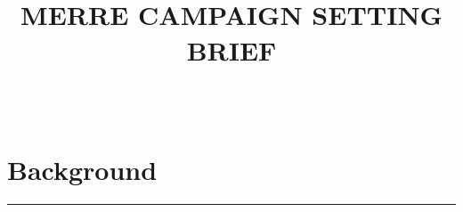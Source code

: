 \documentclass[paper=a4, fontsize=11pt]{scrartcl} %
\title{	
\normalfont \normalsize 
\horrule{0.5pt} \\[0.4cm] %
\begingroup
\medievalsharp
\huge \uppercase{Merre Campaign Setting Brief} \\ %
\endgroup
\horrule{2pt} \\[0.5cm] %
}
\author{} %
\date{} %
\newcommand{\horrule}[1]{\rule{\linewidth}{#1}} %
\begin{document}
\maketitle %


\tableofcontents

\doclicenseThis

\pagebreak

\section{Background}

\horrule{0.5pt} \\[0.4cm] %
\end{document}
